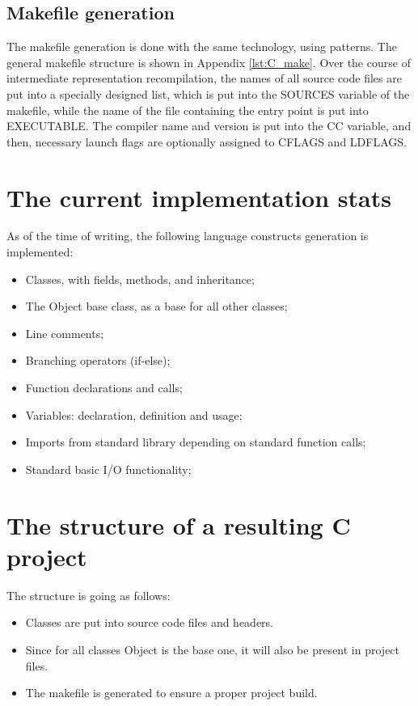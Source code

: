 \subsection{Makefile generation}
The makefile generation is done with the same technology, using patterns. The general makefile structure is shown in Appendix \ref{lst:C_make}.
Over the course of intermediate representation recompilation, the names of all source code files are put into a specially designed list, which is put into the SOURCES variable of the makefile, while the name of the file containing the entry point is put into EXECUTABLE. 
The compiler name and version is put into the CC variable, and then, necessary launch flags are optionally assigned to CFLAGS and LDFLAGS.

\section{The current implementation stats}
As of the time of writing, the following language constructs generation is implemented:
\begin{itemize}
    \item Classes, with fields, methods, and inheritance;
    \item The Object base class, as a base for all other classes;
    \item Line comments;
    \item Branching operators (if-else);
    \item Function declarations and calls;
    \item Variables: declaration, definition and usage;
    \item Imports from standard library depending on standard function calls;
    \item Standard basic I/O functionality;
\end{itemize}


\section{The structure of a resulting C project}
The structure is going as follows:
\begin{itemize}
    \item  Classes are put into source code files and headers.
    \item  Since for all classes Object is the base one, it will also be present in project files.
    \item  The makefile is generated to ensure a proper project build.
\end{itemize}


